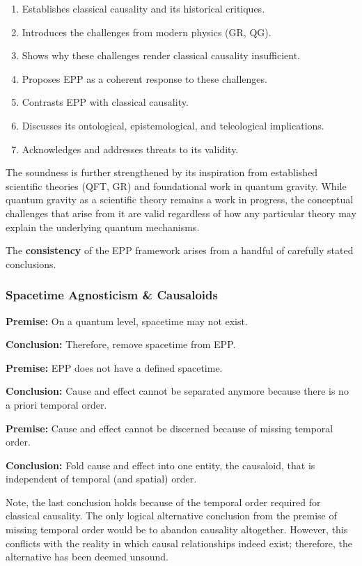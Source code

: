 \documentclass{article}
\begin{document}
\begin{enumerate}
    \item Establishes classical causality and its historical critiques.
    \item Introduces the challenges from modern physics (GR, QG).
    \item Shows why these challenges render classical causality insufficient.
    \item Proposes EPP as a coherent response to these challenges.
    \item Contrasts EPP with classical causality.
    \item Discusses its ontological, epistemological, and teleological implications.
    \item Acknowledges and addresses threats to its validity.
\end{enumerate}

The soundness is further strengthened by its inspiration from established scientific theories (QFT, GR) and foundational work in quantum gravity. While quantum gravity as a scientific theory remains a work in progress, the conceptual challenges that arise from it are valid regardless of how any particular theory may explain the underlying quantum mechanisms.

\newpage

The \textbf{consistency} of the EPP framework arises from a handful of carefully stated conclusions.

\subsubsection{Spacetime Agnosticism \& Causaloids}

\textbf{Premise:} On a quantum level, spacetime may not exist.

\textbf{Conclusion:} Therefore, remove spacetime from EPP.

\textbf{Premise:} EPP does not have a defined spacetime.

\textbf{Conclusion:} Cause and effect cannot be separated anymore because there is no a priori temporal order.

\textbf{Premise:} Cause and effect cannot be discerned because of missing temporal order.

\textbf{Conclusion:} Fold cause and effect into one entity, the causaloid, that is independent of temporal (and spatial) order.

Note, the last conclusion holds because of the temporal order required for classical causality. The only logical alternative conclusion from the premise of missing temporal order would be to abandon causality altogether. However, this conflicts with the reality in which causal relationships indeed exist; therefore, the alternative has been deemed unsound.
\end{document}
